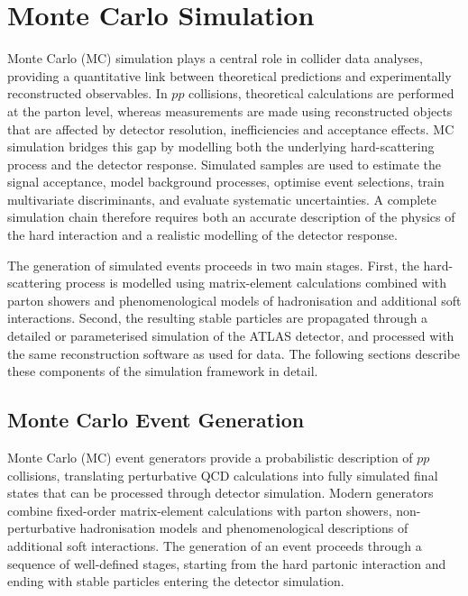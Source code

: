 ﻿\chapter{Monte Carlo Simulation}
\label{chap:simulation}

Monte Carlo (MC) simulation plays a central role in collider data analyses, providing a quantitative link between theoretical predictions and experimentally reconstructed observables. 
In $pp$ collisions, theoretical calculations are performed at the parton level, whereas measurements are made using reconstructed objects that are affected by detector resolution, inefficiencies and acceptance effects. 
MC simulation bridges this gap by modelling both the underlying hard-scattering process and the detector response.
Simulated samples are used to estimate the signal acceptance, model background processes, optimise event selections, train multivariate discriminants, and evaluate systematic uncertainties. 
A complete simulation chain therefore requires both an accurate description of the physics of the hard interaction and a realistic modelling of the detector response.

The generation of simulated events proceeds in two main stages. 
First, the hard-scattering process is modelled using matrix-element calculations combined with parton showers and phenomenological models of hadronisation and additional soft interactions. 
Second, the resulting stable particles are propagated through a detailed or parameterised simulation of the ATLAS detector, and processed with the same reconstruction software as used for data. 
The following sections describe these components of the simulation framework in detail.

\section{Monte Carlo Event Generation}

Monte Carlo (MC) event generators provide a probabilistic description of $pp$ collisions, translating perturbative QCD calculations into fully simulated final states that can be processed through detector simulation. 
Modern generators combine fixed-order matrix-element calculations with parton showers, non-perturbative hadronisation models and phenomenological descriptions of additional soft interactions. 
The generation of an event proceeds through a sequence of well-defined stages, starting from the hard partonic interaction and ending with stable particles entering the detector simulation.

